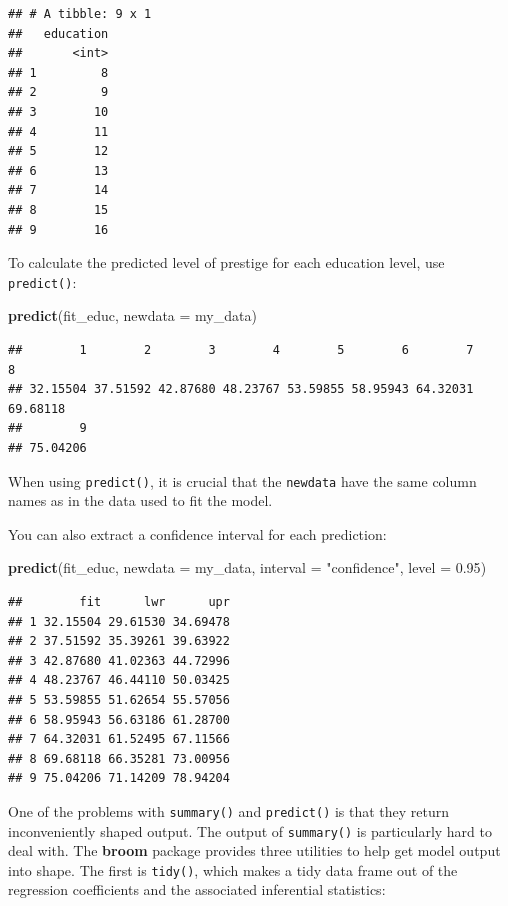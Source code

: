 \documentclass[
  12pt,
  oneside,openany]{book}
\newenvironment{Shaded}{\begin{snugshade}}{\end{snugshade}}
\newcommand{\DataTypeTok}[1]{\textcolor[rgb]{0.13,0.29,0.53}{#1}}
\newcommand{\FloatTok}[1]{\textcolor[rgb]{0.00,0.00,0.81}{#1}}
\newcommand{\KeywordTok}[1]{\textcolor[rgb]{0.13,0.29,0.53}{\textbf{#1}}}
\newcommand{\NormalTok}[1]{#1}
\newcommand{\StringTok}[1]{\textcolor[rgb]{0.31,0.60,0.02}{#1}}
\begin{document}
\begin{verbatim}
## # A tibble: 9 x 1
##   education
##       <int>
## 1         8
## 2         9
## 3        10
## 4        11
## 5        12
## 6        13
## 7        14
## 8        15
## 9        16
\end{verbatim}

To calculate the predicted level of prestige for each education level, use \texttt{predict()}:

\begin{Shaded}
\begin{Highlighting}[]
\KeywordTok{predict}\NormalTok{(fit\_educ, }\DataTypeTok{newdata =}\NormalTok{ my\_data)}
\end{Highlighting}
\end{Shaded}

\begin{verbatim}
##        1        2        3        4        5        6        7        8 
## 32.15504 37.51592 42.87680 48.23767 53.59855 58.95943 64.32031 69.68118 
##        9 
## 75.04206
\end{verbatim}

When using \texttt{predict()}, it is crucial that the \texttt{newdata} have the same column names as in the data used to fit the model.

You can also extract a confidence interval for each prediction:

\begin{Shaded}
\begin{Highlighting}[]
\KeywordTok{predict}\NormalTok{(fit\_educ,}
        \DataTypeTok{newdata =}\NormalTok{ my\_data,}
        \DataTypeTok{interval =} \StringTok{"confidence"}\NormalTok{,}
        \DataTypeTok{level =} \FloatTok{0.95}\NormalTok{)}
\end{Highlighting}
\end{Shaded}

\begin{verbatim}
##        fit      lwr      upr
## 1 32.15504 29.61530 34.69478
## 2 37.51592 35.39261 39.63922
## 3 42.87680 41.02363 44.72996
## 4 48.23767 46.44110 50.03425
## 5 53.59855 51.62654 55.57056
## 6 58.95943 56.63186 61.28700
## 7 64.32031 61.52495 67.11566
## 8 69.68118 66.35281 73.00956
## 9 75.04206 71.14209 78.94204
\end{verbatim}

One of the problems with \texttt{summary()} and \texttt{predict()} is that they return inconveniently shaped output. The output of \texttt{summary()} is particularly hard to deal with. The \textbf{broom} package provides three utilities to help get model output into shape. The first is \texttt{tidy()}, which makes a tidy data frame out of the regression coefficients and the associated inferential statistics:
\end{document}
